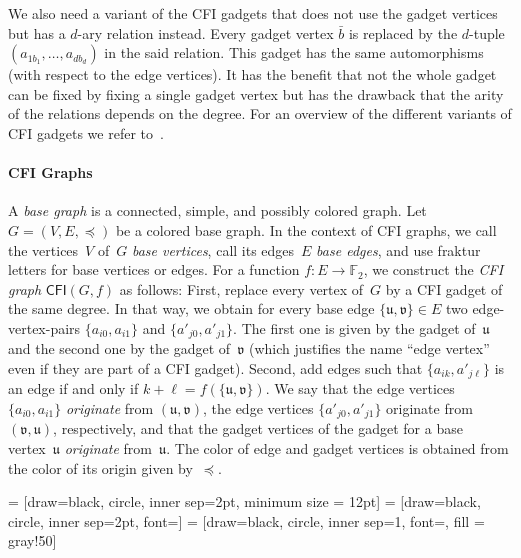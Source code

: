 \documentclass[]{lmcs}
\newcommand{\FF}{\mathbb{F}}
\newcommand{\defining}[1]{\emph{#1}}
\newcommand{\set}[1]{\lbrace #1 \rbrace}
\newcommand{\tup}[1]{\bar{#1}}
\newcommand{\spleq}{\preceq}
\newcommand{\CFIsym}{\mathsf{CFI}}
\newcommand{\CFI}[1]{\CFIsym(#1)}
\newcommand{\bVertA}{\mathfrak{u}}
\newcommand{\bVertB}{\mathfrak{v}}
\begin{document}
We also need a variant of the CFI gadgets that does not use the gadget vertices
but has a $d$-ary relation instead.
Every gadget vertex $\tup{b}$ is replaced by the $d$-tuple $(a_{1b_1}, \dots, a_{db_d})$ in the said relation.
This gadget has the same automorphisms (with respect to the edge vertices).
It has the benefit that not the whole gadget can be fixed by fixing a single
gadget vertex but has the drawback that the arity of the relations depends on the degree.
For an overview of the different variants of CFI gadgets we refer to~\cite{Lichter2023}.

\paragraph{CFI Graphs}
A \defining{base graph} is a connected, simple, and possibly colored graph.
Let ${G=(V,E,\spleq)}$ be a colored base graph.
In the context of CFI graphs,
we call the vertices~$V$ of~$G$ \defining{base vertices},
call its edges~$E$ \defining{base edges},
and use fraktur letters for base vertices or edges.
For a function $f\colon E \to \FF_2$,
we construct the \defining{CFI graph} $\CFI{G, f}$ as follows:
First, replace every vertex of~$G$ by a CFI gadget of the same degree.
In that way, we obtain for every base edge $\set{\bVertA,\bVertB} \in E$
two edge-vertex-pairs $\set{a_{i0},a_{i1}}$ and $\set{a'_{j0},a'_{j1}}$.
The first one is given by the gadget of~$\bVertA$ and the second one by the gadget of~$\bVertB$ (which justifies the name ``edge vertex'' even if they are part of a CFI gadget).
Second, add edges such that $\set{a_{ik},a'_{j\ell}}$ is an edge if and only if
$k + \ell = f(\set{\bVertA,\bVertB})$.
We say that the edge vertices $\set{a_{i0},a_{i1}}$ \defining{originate} from $(\bVertA,\bVertB)$,
the edge vertices $\set{a'_{j0},a'_{j1}}$ originate from $(\bVertB,\bVertA)$, respectively, and
that the gadget vertices of the gadget for a base vertex~$\bVertA$ 
\defining{originate} from~$\bVertA$.
The color of edge and gadget vertices is obtained from the color of its origin given by~$\spleq$.

\def \baseNeighborRadius{1}
\def \edgePairDistAngle{10}
\def \edgePairRadius{2}
\def \gadgetVertexYDist{0.7}


 = [draw=black, circle, inner sep=2pt, minimum size = 12pt]
 = [draw=black, circle, inner sep=2pt, font=\footnotesize]
 = [draw=black, circle, inner sep=1, font=\tiny, fill = gray!50]
\end{document}
